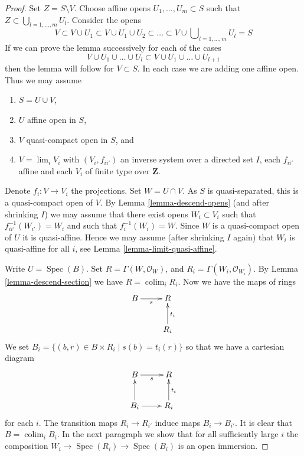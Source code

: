 \documentclass{stacks-project}
\theoremstyle{plain}
\theoremstyle{definition}
\theoremstyle{remark}
\numberwithin{equation}{subsection}
\def\lim{\mathop{\mathrm{lim}}\nolimits}
\def\colim{\mathop{\mathrm{colim}}\nolimits}
\def\Spec{\mathop{\mathrm{Spec}}}
\begin{document}
\begin{proof}
Set $Z = S \setminus V$. Choose affine opens $U_1, \ldots, U_m \subset S$
such that $Z \subset \bigcup_{l = 1, \ldots, m} U_l$. Consider the opens
$$
V \subset V \cup U_1 \subset V \cup U_1 \cup U_2 \subset
\ldots \subset V \cup \bigcup\nolimits_{l = 1, \ldots, m} U_l = S
$$
If we can prove the lemma successively for each of the cases
$$
V \cup U_1 \cup \ldots \cup U_l
\subset
V \cup U_1 \cup \ldots \cup U_{l + 1}
$$
then the lemma will follow for $V \subset S$. In each case we are adding
one affine open. Thus we may assume
\begin{enumerate}
\item $S = U \cup V$,
\item $U$ affine open in $S$,
\item $V$ quasi-compact open in $S$, and
\item $V = \lim_i V_i$ with $(V_i, f_{ii'})$
an inverse system over a directed set $I$, each $f_{ii'}$
affine and each $V_i$ of finite type over $\mathbf{Z}$.
\end{enumerate}
Denote $f_i : V \to V_i$ the projections.
Set $W = U \cap V$. As $S$ is quasi-separated, this is a quasi-compact open
of $V$. By Lemma \ref{lemma-descend-opens}
(and after shrinking $I$) we may assume that there exist
opens $W_i \subset V_i$ such that $f_{ii'}^{-1}(W_{i'}) = W_i$
and such that $f_i^{-1}(W_i) = W$. Since $W$ is a quasi-compact open
of $U$ it is quasi-affine. Hence we may assume (after shrinking $I$ again)
that $W_i$ is quasi-affine for all $i$, see
Lemma \ref{lemma-limit-quasi-affine}.

\medskip\noindent
Write $U = \Spec(B)$. Set $R = \Gamma(W, \mathcal{O}_W)$,
and $R_i = \Gamma(W_i, \mathcal{O}_{W_i})$.
By Lemma \ref{lemma-descend-section} we have $R = \colim_i R_i$.
Now we have the maps of rings
$$
\xymatrix{
B \ar[r]_s & R \\
& R_i \ar[u]_{t_i}
}
$$
We set $B_i = \{(b, r) \in B \times R_i \mid s(b) = t_i(r)\}$ so that we
have a cartesian diagram
$$
\xymatrix{
B \ar[r]_s & R \\
B_i \ar[u] \ar[r] & R_i \ar[u]_{t_i}
}
$$
for each $i$. The transition maps $R_i \to R_{i'}$ induce maps
$B_i \to B_{i'}$. It is clear that $B = \colim_i B_i$.
In the next paragraph we show that for all sufficiently large $i$
the composition $W_i \to \Spec(R_i) \to \Spec(B_i)$ is an open immersion.


\end{proof}
\end{document}
